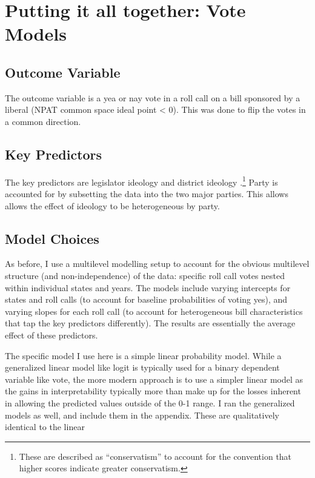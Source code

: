 \documentclass[
  oneside]{book}
\begin{document}
\hypertarget{putting-it-all-together-vote-models}{%
\section{Putting it all together: Vote Models}\label{putting-it-all-together-vote-models}}

\hypertarget{outcome-variable}{%
\subsection{Outcome Variable}\label{outcome-variable}}

The outcome variable is a yea or nay vote in a roll call on a bill sponsored by a liberal (NPAT common space ideal point \textless{} 0). This was done to flip the votes in a common direction.

\hypertarget{key-predictors}{%
\subsection{Key Predictors}\label{key-predictors}}

The key predictors are legislator ideology \citep{Shor:2011} and district ideology \citep{Tausanovitch:2013}.\footnote{These are described as ``conservatism'' to account for the convention that higher scores indicate greater conservatism.} Party is accounted for by subsetting the data into the two major parties. This allows allows the effect of ideology to be heterogeneous by party.

\hypertarget{model-choices}{%
\subsection{Model Choices}\label{model-choices}}

As before, I use a multilevel modelling setup to account for the obvious multilevel structure (and non-independence) of the data: specific roll call votes nested within individual states and years. The models include varying intercepts for states and roll calls (to account for baseline probabilities of voting yes), and varying slopes for each roll call (to account for heterogeneous bill characteristics that tap the key predictors differently). The results are essentially the average effect of these predictors.

The specific model I use here is a simple linear probability model. While a generalized linear model like logit is typically used for a binary dependent variable like vote, the more modern approach is to use a simpler linear model as the gains in interpretability typically more than make up for the losses inherent in allowing the predicted values outside of the 0-1 range. I ran the generalized models as well, and include them in the appendix. These are qualitatively identical to the linear
\end{document}
